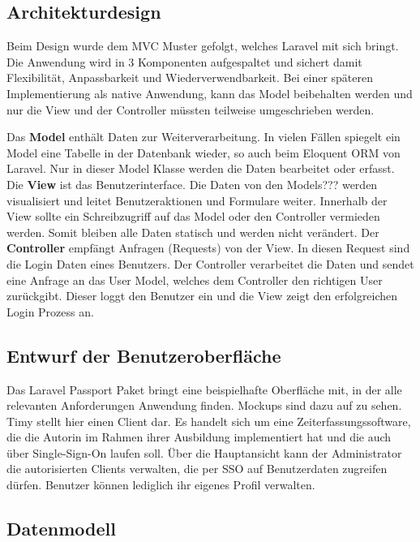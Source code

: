 \subsection{Architekturdesign}
\label{sec:Architekturdesign}

Beim Design wurde dem \ac{MVC} Muster gefolgt, welches Laravel mit sich bringt. Die Anwendung wird in 3 Komponenten aufgespaltet und sichert damit Flexibilität, Anpassbarkeit und Wiederverwendbarkeit.
Bei einer späteren Implementierung als native Anwendung, kann das Model beibehalten werden und nur die View und der Controller müssten teilweise umgeschrieben werden.

Das \textbf{Model} enthält Daten zur Weiterverarbeitung. In vielen Fällen spiegelt ein Model eine Tabelle in der Datenbank wieder, so auch beim Eloquent \ac{ORM} von Laravel. Nur in dieser Model Klasse werden die Daten bearbeitet oder erfasst. 
Die \textbf{View} ist das Benutzerinterface. Die Daten von den Models??? werden visualisiert und leitet \zB Benutzeraktionen und Formulare weiter. Innerhalb der View sollte ein Schreibzugriff auf das Model oder den Controller vermieden werden. Somit bleiben alle Daten statisch und werden nicht verändert.
Der \textbf{Controller} empfängt Anfragen (Requests) von der View. In diesen Request sind \bspw die Login Daten eines Benutzers. Der Controller verarbeitet die Daten und sendet eine Anfrage an das User Model, welches dem Controller den richtigen User zurückgibt. Dieser loggt den Benutzer ein und die View zeigt den erfolgreichen Login Prozess an. 

\subsection{Entwurf der Benutzeroberfläche}
\label{sec:Benutzeroberflaeche} 

Das Laravel Passport Paket bringt eine beispielhafte Oberfläche mit, in der alle relevanten Anforderungen Anwendung finden. 
Mockups sind dazu auf   zu sehen. Timy stellt hier einen Client dar. Es handelt sich um eine Zeiterfassungssoftware, die die Autorin im Rahmen ihrer Ausbildung implementiert hat und die auch über Single-Sign-On laufen soll. 
Über die Hauptansicht kann der Administrator die autorisierten Clients verwalten, die per \ac{SSO} auf  Benutzerdaten zugreifen dürfen. Benutzer können lediglich ihr eigenes Profil verwalten.

\subsection{Datenmodell}
\label{sec:Datenmodell}

